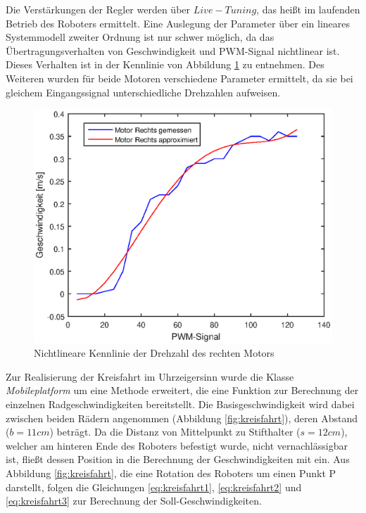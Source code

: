 \documentclass[12pt,a4paper,oneside]{article}
\begin{document}
\begin{spacing}{1.15}
Die Verstärkungen der Regler werden über $Live-Tuning$, das heißt im laufenden Betrieb des Roboters ermittelt. Eine Auslegung der Parameter über ein lineares Systemmodell zweiter Ordnung ist nur schwer möglich, da das Übertragungsverhalten von Geschwindigkeit und PWM-Signal nichtlinear ist. Dieses Verhalten ist in der Kennlinie von Abbildung \ref{fig:nl_kennlinie_R} zu entnehmen.
Des Weiteren wurden für beide Motoren verschiedene Parameter ermittelt, da sie bei gleichem Eingangssignal unterschiedliche Drehzahlen aufweisen. 

\begin{figure}[!htb]
	\centering
	\includegraphics[scale=.7]{figs/Motor_Rechts_Kennlinie.eps}
	\caption{Nichtlineare Kennlinie der Drehzahl des rechten Motors}
	\label{fig:nl_kennlinie_R}
\end{figure}

\newpage
Zur Realisierung der Kreisfahrt im Uhrzeigersinn wurde die Klasse \textit{Mobileplatform} um eine Methode erweitert, die eine Funktion zur Berechnung der einzelnen Radgeschwindigkeiten bereitstellt. Die Basisgeschwindigkeit wird dabei zwischen beiden Rädern angenommen (Abbildung \ref{fig:kreisfahrt}), deren Abstand ($b=11cm$) beträgt. Da die Distanz von Mittelpunkt zu Stifthalter ($s = 12 cm$), welcher am hinteren Ende des Roboters befestigt wurde, nicht vernachlässigbar ist, fließt dessen Position in die Berechnung der Geschwindigkeiten mit ein. Aus Abbildung \ref{fig:kreisfahrt}, die eine Rotation des Roboters um einen Punkt P darstellt, folgen die Gleichungen \ref{eq:kreisfahrt1}, \ref{eq:kreisfahrt2} und \ref{eq:kreisfahrt3} zur Berechnung der Soll-Geschwindigkeiten.


\end{spacing}
\end{document}

